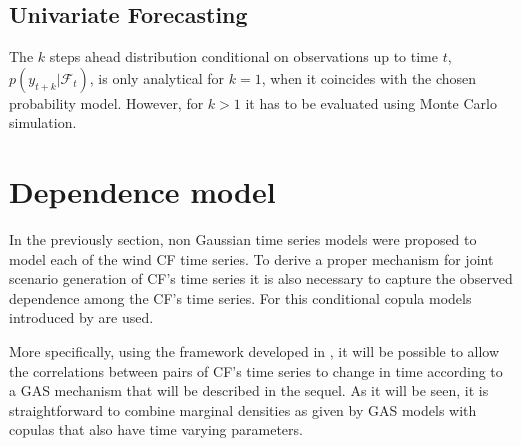 \documentclass[a4paper]{IEEEtran}
\begin{document}
\subsection{Univariate Forecasting}

The $k$ steps ahead distribution conditional on observations up to time $t$, $p(y_{t+k}|\mathcal{F}_{t} )$, is only analytical for $k=1$, when it coincides with the chosen probability model. However, for $k>1$ it has to be evaluated using Monte Carlo simulation.



\section{Dependence model}\label{copula}

In the previously section, non Gaussian time series models were proposed to model each of the wind CF time series. To derive a proper mechanism for joint scenario generation of CF's time series it is also necessary to capture the observed dependence among the CF's time series. For this conditional copula models introduced by \cite{patton2002applications} are used. %

More specifically, using the framework developed in \cite{patton2012copula}, it will be possible to allow the correlations between pairs of CF's time series to change in time according to a GAS mechanism that will be described in the sequel. As it will be seen, it is straightforward to combine marginal densities as given by GAS models with copulas that also have time varying parameters. %
\end{document}
